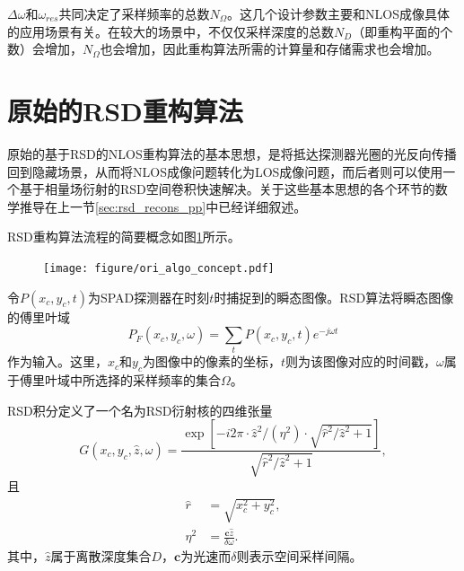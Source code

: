 \documentclass[master]{shtthesis}             %
\begin{document}
$\Delta\omega$和$\omega_{res}$共同决定了采样频率的总数$N_\Omega$。这几个设计参数主要和NLOS成像具体的应用场景有关。在较大的场景中，不仅仅采样深度的总数$N_D$（即重构平面的个数）会增加，$N_\Omega$也会增加，因此重构算法所需的计算量和存储需求也会增加。


\section{原始的RSD重构算法}

原始的基于RSD的NLOS重构算法的基本思想，是将抵达探测器光圈的光反向传播回到隐藏场景，从而将NLOS成像问题转化为LOS成像问题，而后者则可以使用一个基于相量场衍射的RSD空间卷积快速解决\citep{Liu}。关于这些基本思想的各个环节的数学推导在上一节\ref{sec:rsd_recons_pp}中已经详细叙述。

RSD重构算法流程的简要概念如图\ref{fig:ori_algo_concept}所示。
\begin{figure}[!tb]
  \centering
  \texttt{[image: figure/ori\_algo\_concept.pdf]}
  \label{fig:ori_algo_concept}
\end{figure}
令$P(x_c,y_c,t)$为SPAD探测器在时刻$t$时捕捉到的瞬态图像。RSD算法将瞬态图像的傅里叶域
\begin{equation}
  P_F(x_c,y_c,\omega) = \sum_t P(x_c,y_c,t)e^{-j\omega t}
\end{equation}
作为输入。这里，$x_c$和$y_c$为图像中的像素的坐标，$t$则为该图像对应的时间戳，$\omega$属于傅里叶域中所选择的采样频率的集合$\Omega$。

RSD积分定义了一个名为RSD衍射核的四维张量
\begin{equation}\label{eq:kernel}
  G(x_c,y_c,\hat{z},\omega) = \frac{\exp\left[-i2\pi\cdot\hat{z}^2/(\eta^2)\cdot\sqrt{\hat{r}^2/\hat{z}^2+1}\right]}{\sqrt{\hat{r}^2/\hat{z}^2+1}},
\end{equation}
且
\begin{align}
  \hat{r} &= \sqrt{x_c^2+y_c^2}\label{eq:rxy},\\
  \eta^2 &= \frac{\mathbf{c}\hat{z}}{\delta\omega}.
\end{align}
其中，$\hat{z}$属于离散深度集合$D$，$\mathbf{c}$为光速而$\delta$则表示空间采样间隔。
\end{document}
